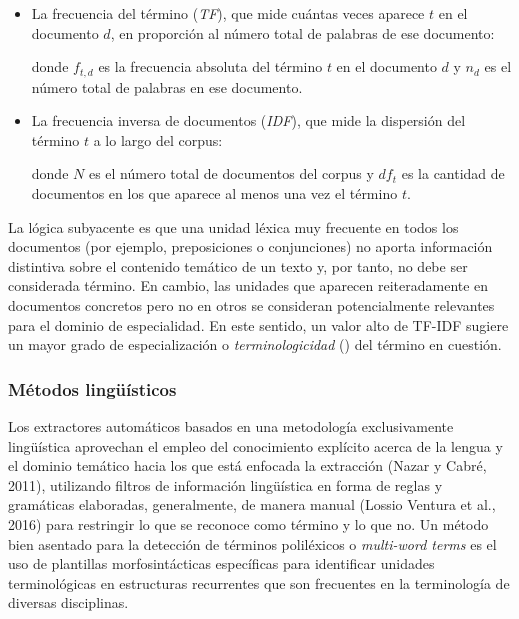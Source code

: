 \begin{itemize}
    \item La frecuencia del término (\emph{TF}), que mide cuántas veces aparece $t$ en el documento $d$, en proporción al número total de palabras de ese documento:
\label{eq:tf}

    donde $f_{t,d}$ es la frecuencia absoluta del término $t$ en el documento $d$ y $n_d$ es el número total de palabras en ese documento.

    \item La frecuencia inversa de documentos (\emph{IDF}), que mide la dispersión del término $t$ a lo largo del corpus:
\label{eq:idf}

    donde $N$ es el número total de documentos del corpus y $df_t$ es la cantidad de documentos en los que aparece al menos una vez el término $t$.
\end{itemize}
La lógica subyacente es que una unidad léxica muy frecuente en todos los documentos (por ejemplo, preposiciones o conjunciones) no aporta información distintiva sobre el contenido temático de un texto y, por tanto, no debe ser considerada término. En cambio, las unidades que aparecen reiteradamente en documentos concretos pero no en otros se consideran potencialmente relevantes para el dominio de especialidad. En este sentido, un valor alto de TF-IDF sugiere un mayor grado de especialización o \emph{terminologicidad} (\cite{rodtapia2024}) del término en cuestión.

\subsubsection{Métodos lingüísticos}

Los extractores automáticos basados en una metodología exclusivamente lingüística aprovechan el empleo del conocimiento explícito acerca de la lengua y el dominio temático hacia los que está enfocada la extracción (Nazar y Cabré, 2011), utilizando filtros de información lingüística en forma de reglas y gramáticas elaboradas, generalmente, de manera manual (Lossio Ventura et al., 2016) para restringir lo que se reconoce como término y lo que no. Un método bien asentado para la detección de términos poliléxicos o \emph{multi-word terms} es el uso de plantillas morfosintácticas específicas para identificar unidades terminológicas en estructuras recurrentes que son frecuentes en la terminología de diversas disciplinas.

